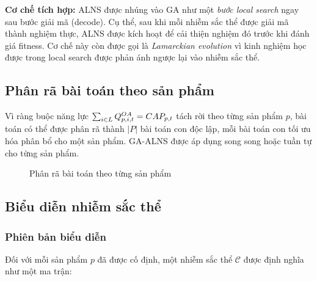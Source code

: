 \medskip

\noindent\textbf{Cơ chế tích hợp:} ALNS được nhúng vào GA như một \emph{bước local search} ngay sau bước giải mã (decode). Cụ thể, sau khi mỗi nhiễm sắc thể được giải mã thành nghiệm thực, ALNS được kích hoạt để cải thiện nghiệm đó trước khi đánh giá fitness. Cơ chế này còn được gọi là \emph{Lamarckian evolution} vì kinh nghiệm học được trong local search được phản ánh ngược lại vào nhiễm sắc thể.

\subsection{Phân rã bài toán theo sản phẩm}

Vì ràng buộc năng lực $\sum_{i \in L} Q^{OA}_{p,i,t} = CAP_{p,t}$ tách rời theo từng sản phẩm $p$, bài toán có thể được phân rã thành $|P|$ bài toán con độc lập, mỗi bài toán con tối ưu hóa phân bổ cho một sản phẩm. GA-ALNS được áp dụng song song hoặc tuần tự cho từng sản phẩm.

\begin{figure}[H]
\centering
{}
\caption{Phân rã bài toán theo từng sản phẩm}
\end{figure}

\subsection{Biểu diễn nhiễm sắc thể}

\subsubsection{Phiên bản biểu diễn}

Đối với mỗi sản phẩm $p$ đã được cố định, một nhiễm sắc thể $\mathcal{C}$ được định nghĩa như một ma trận:

